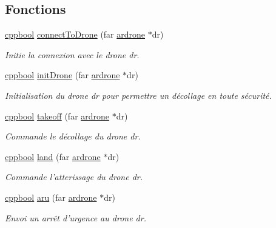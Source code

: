 \subsection*{Fonctions}
\begin{DoxyCompactItemize}
\item 
\hyperlink{group___a_t_commands_ga58b930fb43c5cd2fc89a84647e6fe51c}{cppbool} \hyperlink{group___a_t_commands_gab107cb405a02a0e16ee50f68347c6d4d}{connect\-To\-Drone} (far \hyperlink{structardrone}{ardrone} $\ast$dr)
\begin{DoxyCompactList}\small\item\em Initie la connexion avec le drone dr. \end{DoxyCompactList}\item 
\hyperlink{group___a_t_commands_ga58b930fb43c5cd2fc89a84647e6fe51c}{cppbool} \hyperlink{group___a_t_commands_ga4daa3ada04813c5a99503bd329c6be2c}{init\-Drone} (far \hyperlink{structardrone}{ardrone} $\ast$dr)
\begin{DoxyCompactList}\small\item\em Initialisation du drone dr pour permettre un décollage en toute sécurité. \end{DoxyCompactList}\item 
\hyperlink{group___a_t_commands_ga58b930fb43c5cd2fc89a84647e6fe51c}{cppbool} \hyperlink{group___a_t_commands_ga565736370f76ee54efe74f65acb3ccc4}{takeoff} (far \hyperlink{structardrone}{ardrone} $\ast$dr)
\begin{DoxyCompactList}\small\item\em Commande le décollage du drone dr. \end{DoxyCompactList}\item 
\hyperlink{group___a_t_commands_ga58b930fb43c5cd2fc89a84647e6fe51c}{cppbool} \hyperlink{group___a_t_commands_ga89c4cd20c1bb10d5624cdcc2154efdd1}{land} (far \hyperlink{structardrone}{ardrone} $\ast$dr)
\begin{DoxyCompactList}\small\item\em Commande l'atterissage du drone dr. \end{DoxyCompactList}\item 
\hyperlink{group___a_t_commands_ga58b930fb43c5cd2fc89a84647e6fe51c}{cppbool} \hyperlink{group___a_t_commands_gab16c7bf6e0f5d8df9f422308cb958b2d}{aru} (far \hyperlink{structardrone}{ardrone} $\ast$dr)
\begin{DoxyCompactList}\small\item\em Envoi un arrêt d'urgence au drone dr. \end{DoxyCompactList}\item 

\end{DoxyCompactItemize}
